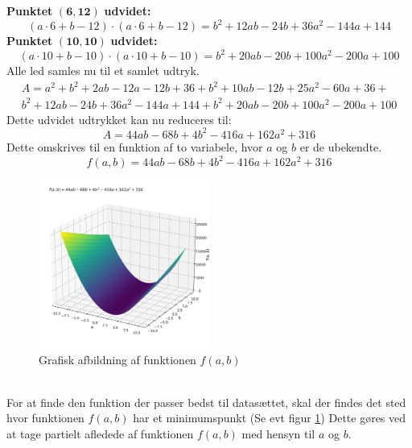\textbf{Punktet}   $\mathbf{(6,12)}$ \textbf{udvidet:}
\begin{equation*}
    (a \cdot 6 + b - 12) \cdot (a \cdot 6 + b - 12) = b^2 + 12ab - 24b + 36a^2 - 144a + 144
\end{equation*}
\textbf{Punktet}   $\mathbf{(10,10)}$ \textbf{udvidet:}
\begin{equation*}
    (a \cdot 10 + b - 10) \cdot (a \cdot 10 + b - 10) = b^2 + 20ab - 20b + 100a^2 - 200a + 100
\end{equation*}
Alle led samles nu til et samlet udtryk. 
\begin{equation*}
    \begin{split}
    A = a^2 + b^2 + 2ab - 12a - 12b + 36 + b^2 + 10ab -12b + 25a^2 - 60a + 36 + \\ b^2 + 12ab - 24b + 36a^2 - 144a + 144 + b^2 + 20ab - 20b + 100a^2 - 200a + 100
\end{split}
\end{equation*}
Dette udvidet udtrykket kan nu reduceres til:
\begin{equation*}
    A = 44ab - 68b + 4b^2 - 416a + 162a^2 + 316
\end{equation*}
Dette omskrives til en funktion af to variabele, hvor $a$ og $b$ er de ubekendte. 
\begin{equation*}
   f(a,b) = 44ab - 68b + 4b^2 - 416a + 162a^2 + 316 
\end{equation*}
\begin{figure}[h!]
    \centering
    \includegraphics[width=0.5\textwidth]{figures/3dGraf.png}
    \caption{Grafisk afbildning af funktionen $f(a,b)$}
    \label{fig:grafiskAfbildningAfFunktionAfToVariable}
\end{figure} \\ 
For at finde den funktion der passer bedst til datasættet, skal der findes det sted hvor funktionen $f(a,b)$ har et minimumspunkt (Se evt figur \ref{fig:grafiskAfbildningAfFunktionAfToVariable}) Dette gøres ved at tage partielt afledede af funktionen $f(a,b)$ med hensyn til $a$ og $b$.  
